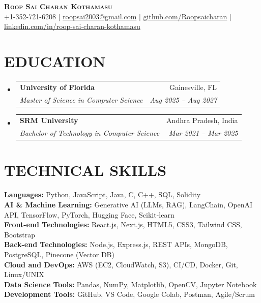 \documentclass[letterpaper,9pt]{extarticle}
\makeatletter
\newcommand{\resumeSubheading}[4]{
  \vspace{1pt}\item
    \begin{tabular*}{1.0\textwidth}[t]{l@{\extracolsep{\fill}}r}
      \textbf{#1} & #2 \\
      \textit{\small#3} & \textit{\small #4} \\
    \end{tabular*}\vspace{-2pt}
}
\newcommand{\resumeSubHeadingListStart}{\begin{itemize}[leftmargin=0.0in, label={}]}
\newcommand{\resumeSubHeadingListEnd}{\end{itemize}\vspace{-6pt}}
\makeatother
\begin{document}
\begin{center}
    \textbf{\Huge \scshape Roop Sai Charan Kothamasu} \\ \vspace{2pt}
    \small
    +1-352-721-6208 $|$
    \href{mailto:roopsai2003@gmail.com}{roopsai2003@gmail.com} $|$
    \href{https://github.com/Roopsaicharan}{github.com/Roopsaicharan} $|$
    \href{https://www.linkedin.com/in/roop-sai-charan-kothamasu-85062b24b/}{linkedin.com/in/roop-sai-charan-kothamasu}
\end{center}

\section{EDUCATION}
  \resumeSubHeadingListStart
    \resumeSubheading
      {University of Florida}{Gainesville, FL}
      {Master of Science in Computer Science}{Aug 2025 -- Aug 2027}
    \resumeSubheading
      {SRM University}{Andhra Pradesh, India}
      {Bachelor of Technology in Computer Science}{Mar 2021 -- Mar 2025}
  \resumeSubHeadingListEnd

\section{TECHNICAL SKILLS}
 \vspace{2pt}
  \begin{itemize}[leftmargin=0.15in, label={}, nosep]
    \small{\item{
      \textbf{Languages:} Python, JavaScript, Java, C, C++, SQL, Solidity \\
      \textbf{AI \& Machine Learning:} Generative AI (LLMs, RAG), LangChain, OpenAI API, TensorFlow, PyTorch, Hugging Face, Scikit-learn \\
      \textbf{Front-end Technologies:} React.js, Next.js, HTML5, CSS3, Tailwind CSS, Bootstrap \\
      \textbf{Back-end Technologies:} Node.js, Express.js, REST APIs, MongoDB, PostgreSQL, Pinecone (Vector DB) \\
      \textbf{Cloud and DevOps:} AWS (EC2, CloudWatch, S3), CI/CD, Docker, Git, Linux/UNIX \\
      \textbf{Data Science Tools:} Pandas, NumPy, Matplotlib, OpenCV, Jupyter Notebook \\
      \textbf{Development Tools:} GitHub, VS Code, Google Colab, Postman, Agile/Scrum
    }}
  \end{itemize}
 \vspace{-4pt}
\end{document}
